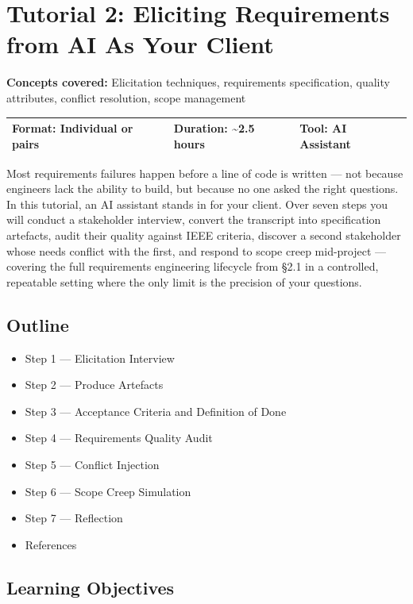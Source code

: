 \documentclass[11pt,a4paper]{book}
\begin{document}
\chapter{Tutorial 2: Eliciting Requirements from AI As Your Client}

\textbf{Concepts covered:} Elicitation techniques, requirements specification, quality attributes, conflict resolution, scope management

\begin{tabular}{lll}
\hline
\textbf{Format:} Individual or pairs & \textbf{Duration:} \textasciitilde{}2.5 hours & \textbf{Tool:} AI Assistant \\
\hline
\end{tabular}

Most requirements failures happen before a line of code is written --- not because engineers lack the ability to build, but because no one asked the right questions. In this tutorial, an AI assistant stands in for your client. Over seven steps you will conduct a stakeholder interview, convert the transcript into specification artefacts, audit their quality against IEEE criteria, discover a second stakeholder whose needs conflict with the first, and respond to scope creep mid-project --- covering the full requirements engineering lifecycle from §2.1 in a controlled, repeatable setting where the only limit is the precision of your questions.

\medskip

\section{Outline}

\begin{itemize}
  \item Step 1 --- Elicitation Interview
  \item Step 2 --- Produce Artefacts
  \item Step 3 --- Acceptance Criteria and Definition of Done
  \item Step 4 --- Requirements Quality Audit
  \item Step 5 --- Conflict Injection
  \item Step 6 --- Scope Creep Simulation
  \item Step 7 --- Reflection
  \item References
\end{itemize}

\medskip

\section{Learning Objectives}
\end{document}
